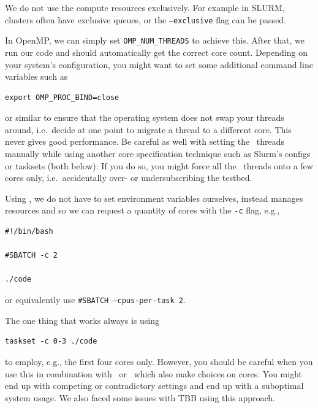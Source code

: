 \begin{assessmentcrime}
    We do not use the compute resources exclusively. For example in SLURM, clusters often have exclusive queues, or the \texttt{--exclusive} flag can be passed.
\end{assessmentcrime}


\begin{instructions}{\openmp}
 In OpenMP, we can simply set \texttt{OMP\_NUM\_THREADS} to achieve this.
 After that, we run our code and should automatically get the correct core
 count.
 Depending on your system's configuration, you might want to set some additional
 command line variables such as 
 \begin{verbatim}
export OMP_PROC_BIND=close 
 \end{verbatim}
 or similar to ensure that the operating system does not swap your threads
 around, i.e.~decide at one point to migrate a thread to a different core.
 This never gives good performance.
 Be careful as well with setting the \openmp\ threads manually while using
 another core specification technique such as Slurm's configs or tasksets (both
 below):
 If you do so, you might force all the \openmp\ threads onto a few cores only,
 i.e.~accidentally over- or undersubscribing the testbed.
\end{instructions}


\begin{instructions}{\slurm}

Using \slurm, we do not have to set environment variables ourselves, instead \slurm manages resources and so we can request a quantity of cores with the \texttt{-c} flag, e.g.,
\begin{verbatim}
#!/bin/bash
 
#SBATCH -c 2
 
./code
\end{verbatim}
or equivalently use \texttt{\#SBATCH --cpus-per-task 2}.

\end{instructions}


\begin{instructions}{\linux}
The one thing that works always is using 

\begin{verbatim}
taskset -c 0-3 ./code
\end{verbatim}

\noindent
to employ, e.g., the first four cores only.
However, you should be careful when you use this in combination with \slurm~or
\openmp~which also make choices on cores.
You might end up with competing or contradictory settings and end up with a
suboptimal system usage.
We also faced some issues with TBB using this approach. 
\end{instructions}



